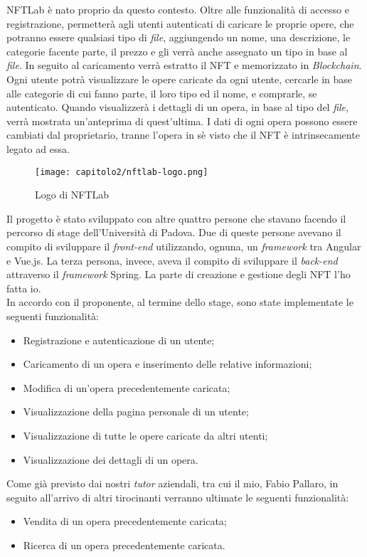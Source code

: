 NFTLab è nato proprio da questo contesto. Oltre alle funzionalità di accesso e registrazione, permetterà agli utenti autenticati di caricare le proprie opere, che potranno essere qualsiasi tipo di \textit{file}, aggiungendo un nome, una descrizione, le categorie facente parte, il prezzo e gli verrà anche assegnato un tipo in base al \textit{file}. In seguito al caricamento verrà estratto il NFT e memorizzato in \textit{Blockchain}. 
Ogni utente potrà visualizzare le opere caricate da ogni utente, cercarle in base alle categorie di cui fanno parte, il loro tipo ed il nome, e comprarle, se autenticato. Quando visualizzerà i dettagli di un opera, in base al tipo del \textit{file}, verrà mostrata un'anteprima di quest'ultima.
I dati di ogni opera possono essere cambiati dal proprietario, tranne l'opera in sè visto che il NFT è intrinsecamente legato ad essa.

\begin{figure}[!h]
  \centering
  \texttt{[image: capitolo2/nftlab-logo.png]}
  \caption{Logo di NFTLab}
\end{figure}

Il progetto è stato sviluppato con altre quattro persone che stavano facendo il percorso di stage dell'Università di Padova. Due di queste persone avevano il compito di sviluppare il \textit{front-end} utilizzando, ognuna, un \textit{framework} tra Angular e Vue.js. La terza persona, invece, aveva il compito di sviluppare il \textit{back-end} attraverso il \textit{framework} Spring. La parte di creazione e gestione degli NFT l'ho fatta io. \\

\noindent In accordo con il proponente, al termine dello stage, sono state implementate le seguenti funzionalità:
\begin{itemize}
  \item Registrazione e autenticazione di un utente;
  \item Caricamento di un opera e inserimento delle relative informazioni;
  \item Modifica di un'opera precedentemente caricata;
  \item Visualizzazione della pagina personale di un utente;
  \item Visualizzazione di tutte le opere caricate da altri utenti;
  \item Visualizzazione dei dettagli di un opera.
\end{itemize}

\noindent Come già previsto dai nostri \textit{tutor} aziendali, tra cui il mio, Fabio Pallaro, in seguito all'arrivo di altri tirocinanti verranno ultimate le seguenti funzionalità:
\begin{itemize}
  \item Vendita di un opera precedentemente caricata;
  \item Ricerca di un opera precedentemente caricata.
\end{itemize}

